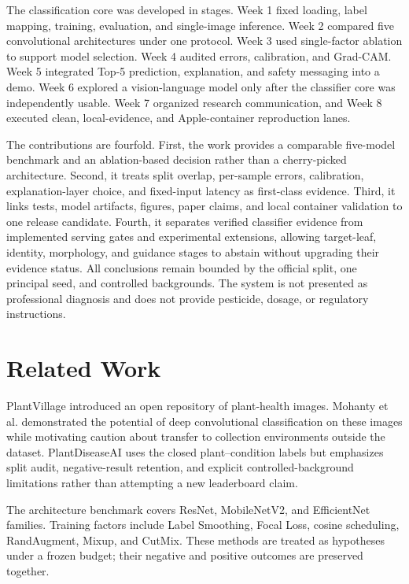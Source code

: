 \documentclass[11pt]{article}
\begin{document}
The classification core was developed in stages. Week 1 fixed loading, label mapping, training, evaluation, and single-image inference. Week 2 compared five convolutional architectures under one protocol. Week 3 used single-factor ablation to support model selection. Week 4 audited errors, calibration, and Grad-CAM. Week 5 integrated Top-5 prediction, explanation, and safety messaging into a demo. Week 6 explored a vision-language model only after the classifier core was independently usable. Week 7 organized research communication, and Week 8 executed clean, local-evidence, and Apple-container reproduction lanes.

The contributions are fourfold. First, the work provides a comparable five-model benchmark and an ablation-based decision rather than a cherry-picked architecture. Second, it treats split overlap, per-sample errors, calibration, explanation-layer choice, and fixed-input latency as first-class evidence. Third, it links tests, model artifacts, figures, paper claims, and local container validation to one release candidate. Fourth, it separates verified classifier evidence from implemented serving gates and experimental extensions, allowing target-leaf, identity, morphology, and guidance stages to abstain without upgrading their evidence status. All conclusions remain bounded by the official split, one principal seed, and controlled backgrounds. The system is not presented as professional diagnosis and does not provide pesticide, dosage, or regulatory instructions.

\section{Related Work}

PlantVillage introduced an open repository of plant-health images\cite{hughes2015plantvillage}. Mohanty et al. demonstrated the potential of deep convolutional classification on these images while motivating caution about transfer to collection environments outside the dataset\cite{mohanty2016plantdisease}. PlantDiseaseAI uses the closed plant--condition labels but emphasizes split audit, negative-result retention, and explicit controlled-background limitations rather than attempting a new leaderboard claim.

The architecture benchmark covers ResNet\cite{he2016resnet}, MobileNetV2\cite{sandler2018mobilenetv2}, and EfficientNet\cite{tan2019efficientnet} families. Training factors include Label Smoothing\cite{szegedy2016label}, Focal Loss\cite{lin2017focal}, cosine scheduling\cite{loshchilov2017sgdr}, RandAugment\cite{cubuk2020randaugment}, Mixup\cite{zhang2018mixup}, and CutMix\cite{yun2019cutmix}. These methods are treated as hypotheses under a frozen budget; their negative and positive outcomes are preserved together.
\end{document}
